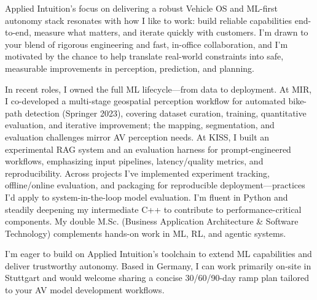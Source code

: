 Applied Intuition’s focus on delivering a robust Vehicle OS and ML-first autonomy stack resonates with how I like to work: build reliable capabilities end-to-end, measure what matters, and iterate quickly with customers. I’m drawn to your blend of rigorous engineering and fast, in-office collaboration, and I’m motivated by the chance to help translate real-world constraints into safe, measurable improvements in perception, prediction, and planning.

In recent roles, I owned the full ML lifecycle—from data to deployment. At MIR, I co-developed a multi-stage geospatial perception workflow for automated bike-path detection (Springer 2023), covering dataset curation, training, quantitative evaluation, and iterative improvement; the mapping, segmentation, and evaluation challenges mirror AV perception needs. At KISS, I built an experimental RAG system and an evaluation harness for prompt-engineered workflows, emphasizing input pipelines, latency/quality metrics, and reproducibility. Across projects I’ve implemented experiment tracking, offline/online evaluation, and packaging for reproducible deployment—practices I’d apply to system-in-the-loop model evaluation. I’m fluent in Python and steadily deepening my intermediate C++ to contribute to performance-critical components. My double M.Sc. (Business Application Architecture & Software Technology) complements hands-on work in ML, RL, and agentic systems.

I’m eager to build on Applied Intuition’s toolchain to extend ML capabilities and deliver trustworthy autonomy. Based in Germany, I can work primarily on-site in Stuttgart and would welcome sharing a concise 30/60/90-day ramp plan tailored to your AV model development workflows.